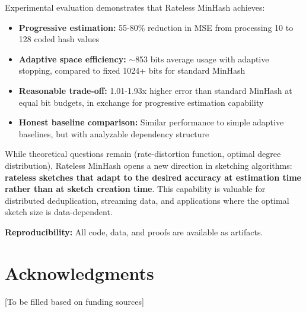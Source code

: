 \documentclass[11pt,letterpaper]{article}
\begin{document}
Experimental evaluation demonstrates that Rateless MinHash achieves:
\begin{itemize}
    \item \textbf{Progressive estimation:} 55-80\% reduction in MSE from processing 10 to 128 coded hash values
    \item \textbf{Adaptive space efficiency:} $\sim$853 bits average usage with adaptive stopping, compared to fixed 1024+ bits for standard MinHash
    \item \textbf{Reasonable trade-off:} 1.01-1.93x higher error than standard MinHash at equal bit budgets, in exchange for progressive estimation capability
    \item \textbf{Honest baseline comparison:} Similar performance to simple adaptive baselines, but with analyzable dependency structure
\end{itemize}

While theoretical questions remain (rate-distortion function, optimal degree distribution), Rateless MinHash opens a new direction in sketching algorithms: \textbf{rateless sketches that adapt to the desired accuracy at estimation time rather than at sketch creation time}. This capability is valuable for distributed deduplication, streaming data, and applications where the optimal sketch size is data-dependent.

\textbf{Reproducibility:} All code, data, and proofs are available as artifacts.

\section*{Acknowledgments}

[To be filled based on funding sources]



\end{document}
